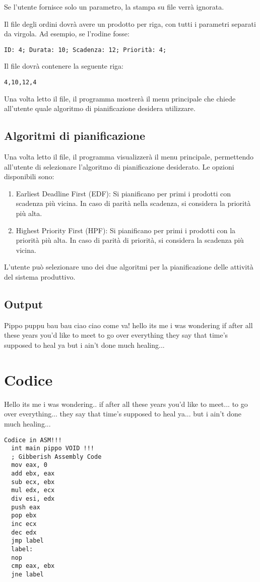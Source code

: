 \documentclass[a4paper]{report}
\begin{document}
Se l'utente fornisce solo un parametro, la stampa su file verrà ignorata.

Il file degli ordini dovrà avere un prodotto per riga, con tutti i parametri separati da virgola. Ad esempio, se l'rodine fosse:
\begin{verbatim}
ID: 4; Durata: 10; Scadenza: 12; Priorità: 4;
\end{verbatim}
Il file dovrà contenere la seguente riga:
\begin{verbatim}
4,10,12,4
\end{verbatim}

Una volta letto il file, il programma mostrerà il menu principale che chiede all'utente quale algoritmo di pianificazione desidera utilizzare.



\subsection{Algoritmi di pianificazione}
Una volta letto il file, il programma visualizzerà il menu principale, permettendo all'utente di selezionare l'algoritmo di pianificazione desiderato. Le opzioni disponibili sono:

\begin{enumerate}
    \item Earliest Deadline First (EDF): Si pianificano per primi i prodotti con scadenza più vicina. In caso di parità nella scadenza, si considera la priorità più alta.
    \item Highest Priority First (HPF): Si pianificano per primi i prodotti con la priorità più alta. In caso di parità di priorità, si considera la scadenza più vicina.
\end{enumerate}

L'utente può selezionare uno dei due algoritmi per la pianificazione delle attività del sistema produttivo.

\subsection{Output}

Pippo puppu bau bau ciao ciao come va! hello its me i was wondering if after all these years you'd like to meet to go over everything they say that time's supposed to heal ya but i ain't done much healing...

\section{Codice}

Hello its me i was wondering.. if after all these years you'd like to meet... to go over everything... they say that time's supposed to heal ya... but i ain't done much healing...

\begin{lstlisting}[firstnumber=34]
  Codice in ASM!!!
  int main pippo VOID !!!
  ; Gibberish Assembly Code
  mov eax, 0
  add ebx, eax
  sub ecx, ebx
  mul edx, ecx
  div esi, edx
  push eax
  pop ebx
  inc ecx
  dec edx
  jmp label
  label:
  nop
  cmp eax, ebx
  jne label

\end{lstlisting}


\vspace{20pt}
\end{document}
